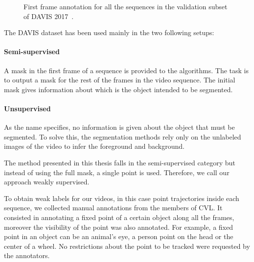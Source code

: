 \begin{figure}[h]
  \centering
  \caption{First frame annotation for all the sequences in the validation subset of DAVIS 2017~\davislast{}. }
  \label{fig:datasets:davis}
\end{figure}


The DAVIS dataset has been used mainly in the two following setups:

\paragraph{Semi-supervised}

A mask in the first frame of a sequence is provided to the algorithms.
The task is to output a mask for the rest of the frames in the video sequence.
The initial mask gives information about which is the object intended to be segmented.

\paragraph{Unsupervised}

As the name specifies, no information is given about the object that must be segmented.
To solve this, the segmentation methods rely only on the unlabeled images of the video to infer the foreground and background.

The method presented in this thesis falls in the semi-supervised category but instead of using the full mask, a single point is used. Therefore, we call our approach weakly supervised.

To obtain weak labels for our videos, in this case point trajectories inside each sequence, we collected manual annotations from the members of CVL.
It consisted in annotating a fixed point of a certain object along all the frames, moreover the visibility of the point was also annotated.
For example, a fixed point in an object can be an animal's eye, a person point on the head or the center of a wheel. No restrictions about the point to be tracked were requested by the annotators.

